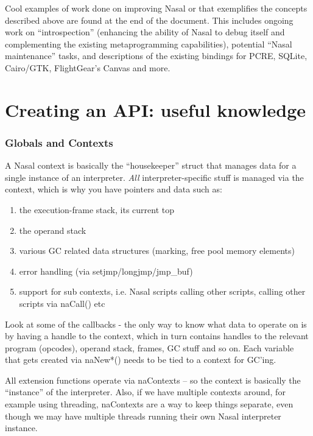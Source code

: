 \documentclass{article}
\newcommand{\todo}[1]{}
\begin{document}
Cool examples of work done on improving Nasal or that exemplifies the concepts described above are found at the end of the document.  This includes ongoing work on ``introspection'' (enhancing the ability of Nasal to debug itself and complementing the existing metaprogramming capabilities), potential ``Nasal maintenance'' tasks, and descriptions of the existing bindings for PCRE, SQLite, Cairo/GTK, FlightGear's Canvas and more.

\part{Creating an API: useful knowledge}

\section{Globals and Contexts}
\todo{document the globals struct and naContext, needs rewording (taken from PMs) also document initGlobals, init Context etc}

A Nasal context is basically the ``housekeeper'' struct that manages data for a single instance of an interpreter.  \emph{All} interpreter-specific stuff is managed via the context, which is why you have pointers and data such as:

\begin{enumerate}
 \item the execution-frame stack, its current top
 \item the operand stack
 \item various GC related data structures (marking, free pool memory elements)
 \item error handling (via setjmp/longjmp/jmp\_buf)
 \item support for sub contexts, i.e. Nasal scripts calling other scripts, calling other scripts via naCall() etc
\end{enumerate}

Look at some of the callbacks - the only way to know what data to operate on is by having a handle to the context, which in turn contains handles to the relevant program (opcodes), operand stack, frames, GC stuff and so on.  Each variable that gets created via naNew*() needs to be tied to a context for GC'ing.

All extension functions operate via naContexts -- so the context is basically the ``instance'' of the interpreter.  Also, if we have multiple contexts around, for example using threading, naContexts are a way to keep things separate, even though we may have multiple threads running their own Nasal interpreter instance.
\end{document}
